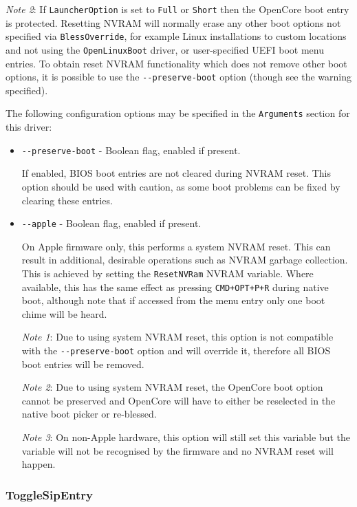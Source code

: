 \documentclass[]{article}
\begin{document}
\emph{Note 2}: If \texttt{LauncherOption} is set to \texttt{Full} or \texttt{Short} then the
OpenCore boot entry is protected. Resetting NVRAM will normally erase any other boot options
not specified via \texttt{BlessOverride}, for example Linux installations to custom locations
and not using the \texttt{OpenLinuxBoot} driver, or user-specified UEFI boot menu entries.
To obtain reset NVRAM functionality which does not remove other boot options, it is possible
to use the \texttt{-{}-preserve-boot} option (though see the warning specified).

The following configuration options may be specified in the \texttt{Arguments} section for this driver:

\begin{itemize}
  \item \texttt{-{}-preserve-boot} - Boolean flag, enabled if present. \medskip

  If enabled, BIOS boot entries are not cleared during NVRAM reset. This option should
  be used with caution, as some boot problems can be fixed by clearing these entries. \medskip

  \item \texttt{-{}-apple} - Boolean flag, enabled if present. \medskip

  On Apple firmware only, this performs a system NVRAM reset. This can result in
  additional, desirable operations such as NVRAM garbage collection. This is achieved by
  setting the \texttt{ResetNVRam} NVRAM variable.
  Where available, this has the same effect as pressing \texttt{CMD+OPT+P+R} during native boot,
  although note that if accessed from the menu entry only one boot chime will be heard. \medskip

  \emph{Note 1}: Due to using system NVRAM reset, this option is not compatible with the \texttt{-{}-preserve-boot}
  option and will override it, therefore all BIOS boot entries will be removed. \medskip

  \emph{Note 2}: Due to using system NVRAM reset, the OpenCore boot option
  cannot be preserved and OpenCore will have to either be reselected in the native boot picker or
  re-blessed. \medskip

  \emph{Note 3}: On non-Apple hardware, this option will still set this variable but the
  variable will not be recognised by the firmware and no NVRAM reset will happen. \medskip
\end{itemize}

\subsubsection{ToggleSipEntry}\label{uefitogglesip}
\end{document}
